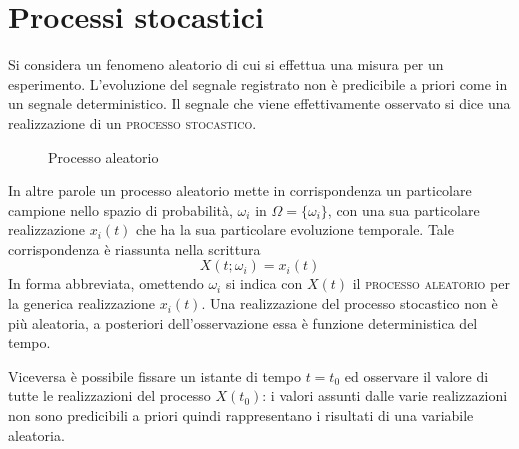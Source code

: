 \chapter{Processi stocastici}
\label{ch:teoriasegnali-capitolo6}
Si considera un fenomeno aleatorio di cui si effettua una misura per un esperimento. L'evoluzione del segnale registrato non è predicibile a priori come in un segnale deterministico. Il segnale che viene effettivamente osservato si dice una realizzazione di un \textsc{processo stocastico}.

\begin{figure}[!ht]
	
	\caption{Processo aleatorio}
\end{figure}

In altre parole un processo aleatorio mette in corrispondenza un particolare campione nello spazio di probabilità, $\omega_i$ in $\Omega=\{\omega_i\}$, con una sua particolare realizzazione $x_i(t)$ che ha la sua particolare evoluzione temporale. Tale corrispondenza è riassunta nella scrittura
\begin{equation}
	X(t;\omega_i)=x_i(t)
\end{equation}
In forma abbreviata, omettendo $\omega_i$ si indica con $X(t)$ il \textsc{processo aleatorio} per la generica realizzazione $x_i(t)$.
Una realizzazione del processo stocastico non è più aleatoria, a posteriori dell'osservazione essa è funzione deterministica del tempo.

Viceversa è possibile fissare un istante di tempo $t=t_0$ ed osservare il valore di tutte le realizzazioni del processo $X(t_0)$: i valori assunti dalle varie realizzazioni non sono predicibili a priori quindi rappresentano i risultati di una variabile aleatoria.

